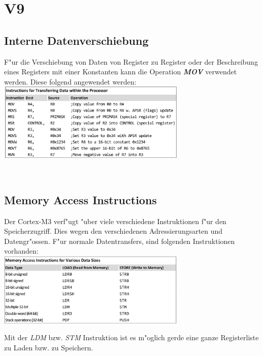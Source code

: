 \section{V9}
\begin{minipage}[t]{9cm}
	\subsection{Interne Datenverschiebung}
F"ur die Verschiebung von Daten von Register zu Register oder der Beschreibung eines Registers mit einer Konstanten kann die Operation \textbf{\textit{MOV} }verwendet werden. Diese folgend angewendet werden: \\

\includegraphics[width=9cm]{images/MOV-Instruktion}
\end{minipage}
%
\begin{minipage}[t]{0.5cm}
	\-\
\end{minipage}
%
\begin{minipage}[t]{9cm}
	\subsection{Memory Access Instructions}
	Der Cortex-M3 verf"ugt "uber viele verschiedene Instruktionen f"ur den Speicherzugriff. Dies wegen den verschiedenen Adressierungsarten und Datengr"ossen. F"ur normale Datentransfers, sind folgenden Instruktionen vorhanden:\\
		
		\includegraphics[width=9cm]{images/LDR-Instruktion}
		
		Mit der \textit{LDM} bzw. \textit{STM} Instruktion ist es m"oglich gerde eine ganze Registerliste zu Laden bzw. zu Speichern.
\end{minipage}

